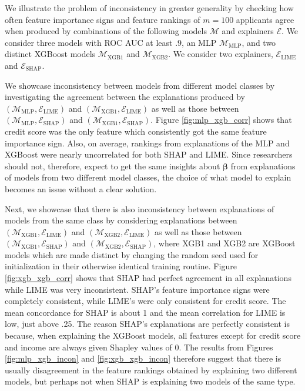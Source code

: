 \documentclass[mnsc,blindrev]{informs3}
\begin{document}
        We illustrate the problem of inconsistency in greater generality by checking how often  feature importance signs and feature rankings of $m=100$ applicants agree when produced by combinations of the following models $\mathcal{M}$ and explainers $\mathcal{E}$. We consider three models with ROC AUC at least $.9$, an MLP $\mathcal{M}_{\text{MLP}}$, and two distinct XGBoost models $\mathcal{M}_{\text{XGB1}}$ and $\mathcal{M}_{\text{XGB2}}$. We consider two explainers, $\mathcal{E}_{\text{LIME}}$ and $\mathcal{E}_{\text{SHAP}}$.
        
        
        We showcase inconsistency between models from different model classes by investigating the agreement between the explanations produced by $(\mathcal{M}_{\text{MLP}}, \mathcal{E}_{\text{LIME}})$ and $(\mathcal{M}_{\text{XGB1}}, \mathcal{E}_{\text{LIME}})$ as well as those between $(\mathcal{M}_{\text{MLP}}, \mathcal{E}_{\text{SHAP}})$ and $(\mathcal{M}_{\text{XGB1}}, \mathcal{E}_{\text{SHAP}})$. Figure \ref{fig:mlp_xgb_corr} shows that credit score was the only feature which consistently got the same feature importance sign. Also, on average, rankings from explanations of the MLP and XGBoost were nearly uncorrelated for both SHAP and LIME. Since researchers should not, therefore, expect to get the same insights about $\boldsymbol{\beta}$ from explanations of models from two different model classes, the choice of what model to explain becomes an issue without a clear solution.
        
        Next, we showcase that there is also inconsistency between explanations of models from the same class by considering explanations between   $(\mathcal{M}_{\text{XGB1}}, \mathcal{E}_{\text{LIME}})$ and $(\mathcal{M}_{\text{XGB2}}, \mathcal{E}_{\text{LIME}})$ as well as those between $(\mathcal{M}_{\text{XGB1}}, \mathcal{E}_{\text{SHAP}})$ and $(\mathcal{M}_{\text{XGB2}}, \mathcal{E}_{\text{SHAP}})$, where XGB1 and XGB2 are XGBoost models which are made distinct by changing the random seed used for initialization in their otherwise identical training routine. Figure \ref{fig:xgb_xgb_corr} shows that SHAP had perfect agreement in all explanations while LIME was very inconsistent. SHAP's feature importance signs were completely consistent, while LIME's were only consistent for credit score. The mean concordance for SHAP is about 1 and the mean correlation for LIME is low, just above .25. The reason SHAP's explanations are perfectly consistent is because, when explaining the XGBoost models, all features except for credit score and income are always given Shapley values of 0. 
        The results from Figures \ref{fig:mlp_xgb_incon} and \ref{fig:xgb_xgb_incon} therefore suggest that there is usually disagreement in the feature rankings obtained by explaining two different models, but perhaps not when SHAP is explaining two models of the same type. 
        
\end{document}
